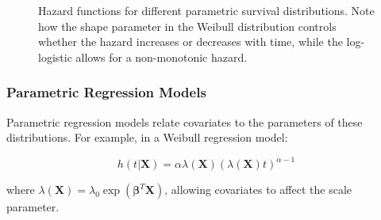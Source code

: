 \begin{figure}[htbp]
    \centering
{}
    \caption{Hazard functions for different parametric survival distributions. Note how the shape parameter in the Weibull distribution controls whether the hazard increases or decreases with time, while the log-logistic allows for a non-monotonic hazard.}
    \label{fig:parametric-hazards}
\end{figure}

\subsubsection{Parametric Regression Models}

Parametric regression models relate covariates to the parameters of these distributions. For example, in a Weibull regression model:

\begin{equationbox}[title=Parametric Regression Model]
\begin{equation}
h(t|\mathbf{X}) = \alpha \lambda(\mathbf{X}) (\lambda(\mathbf{X}) t)^{\alpha-1}
\end{equation}

where $\lambda(\mathbf{X}) = \lambda_0 \exp(\boldsymbol{\beta}^T \mathbf{X})$, allowing covariates to affect the scale parameter.
\end{equationbox}

